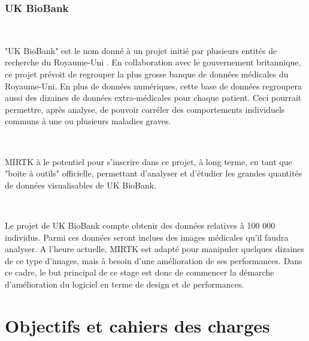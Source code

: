 \documentclass[10pt]{report}
\begin{document}
	 \subsection{UK BioBank}~\par
	 "UK BioBank" est le nom donné à un projet initié par plusieurs entités de recherche du Royaume-Uni . En collaboration avec le gouvernement britannique, ce projet prévoit de regrouper la plus grosse banque de données médicales du Royaume-Uni. En plus de données numériques, cette base de données regroupera aussi des dizaines de données extra-médicales pour chaque patient. Ceci pourrait permettre, après analyse, de pouvoir corréler des comportements individuels communs à une ou plusieurs maladies graves. ~\par~\par
	 
	 MIRTK à le potentiel pour s'inscrire dans ce projet, à long terme, en tant que "boite à outils" officielle, permettant d'analyser et d'étudier les grandes quantités de données visualisables de UK BioBank. ~\par~\par
	 Le projet de UK BioBank compte obtenir des données relatives à 100 000 individus. Parmi ces données seront inclues des images médicales qu'il faudra analyser. A l'heure actuelle, MIRTK est adapté pour manipuler quelques dizaines de ce type d'images, mais à besoin d'une amélioration de ses performances. Dans ce cadre, le but principal de ce stage est donc de commencer la démarche d'amélioration du logiciel en terme de design et de performances.
\chapter{Objectifs et cahiers des charges}
\end{document}
